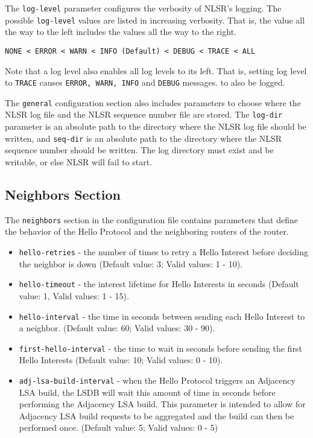 The \texttt{log-level} parameter configures the verbosity of NLSR's logging.
The possible \texttt{log-level} values are listed in increasing verbosity. That is, the value all the way to the left includes the values all the way to the right.
\begin{verbatim}
NONE < ERROR < WARN < INFO (Default) < DEBUG < TRACE < ALL
\end{verbatim}

Note that a log level also enables all log levels to its left. That is, setting log level to \texttt{TRACE} causes \texttt{ERROR, WARN, INFO} and \texttt{DEBUG} messages. to also be logged.

The \texttt{general} configuration section also includes parameters to choose where the NLSR log file and the NLSR sequence number file are stored.
The \texttt{log-dir} parameter is an absolute path to the directory where the NLSR log file should be written, and \texttt{seq-dir} is an absolute path to the directory where the NLSR sequence number should be written. The log directory must exist and be writable, or else NLSR will fail to start.

\subsection{Neighbors Section}

The \texttt{neighbors} section in the configuration file contains parameters that define the behavior of the Hello Protocol and the neighboring routers of the router.
\begin{itemize}
\item \texttt{hello-retries} - the number of times to retry a Hello Interest before deciding the neighbor is down (Default value: 3; Valid values: 1 - 10).
\item \texttt{hello-timeout} - the interest lifetime for Hello Interests in seconds (Default value: 1, Valid values: 1 - 15).
\item \texttt{hello-interval} - the time in seconds between sending each Hello Interest to a neighbor. (Default value: 60; Valid values: 30 - 90).
\item \texttt{first-hello-interval} -  the time to wait in seconds before sending the first Hello Interests (Default value: 10; Valid values: 0 - 10).
\item \texttt{adj-lsa-build-interval} - when the Hello Protocol triggers an Adjacency LSA build, the LSDB will wait this amount of time in seconds before performing the Adjacency LSA build. This parameter is intended to allow for Adjacency LSA build requests to be aggregated and the build can then be performed once. (Default value: 5; Valid values: 0 - 5)
\end{itemize}

